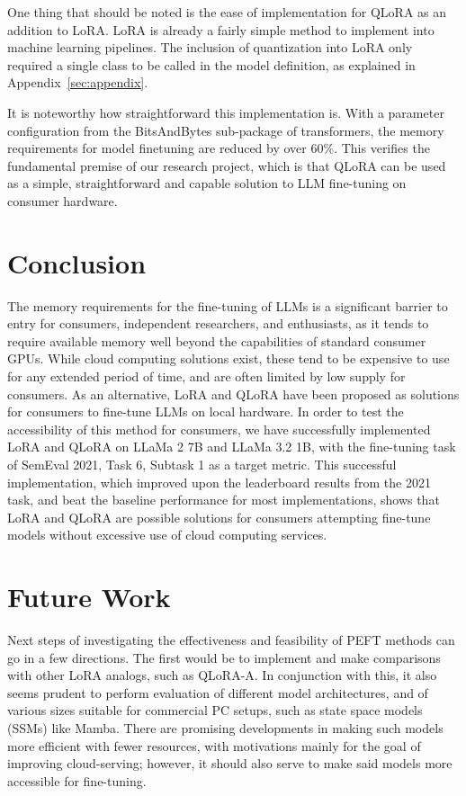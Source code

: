 \documentclass[11pt]{article}
\begin{document}
One thing that should be noted is the ease of implementation for QLoRA as an addition to LoRA. LoRA is already a fairly simple method to implement into machine learning pipelines. The inclusion of quantization into LoRA only required a single class to be called in the model definition, as explained in Appendix~\ref{sec:appendix}.

It is noteworthy how straightforward this implementation is. With a parameter configuration from the BitsAndBytes sub-package of transformers, the memory requirements for model finetuning are reduced by over 60\%. This verifies the fundamental premise of our research project, which is that QLoRA can be used as a simple, straightforward and capable solution to LLM fine-tuning on consumer hardware.

\section{Conclusion}

The memory requirements for the fine-tuning of LLMs is a significant barrier to entry for consumers, independent researchers, and enthusiasts, as it tends to require available memory well beyond the capabilities of standard consumer GPUs. While cloud computing solutions exist, these tend to be expensive to use for any extended period of time, and are often limited by low supply for consumers. As an alternative, LoRA and QLoRA have been proposed as solutions for consumers to fine-tune LLMs on local hardware. In order to test the accessibility of this method for consumers, we have successfully implemented LoRA and QLoRA on LLaMa 2 7B and LLaMa 3.2 1B, with the fine-tuning task of SemEval 2021, Task 6, Subtask 1 as a target metric. This successful implementation, which improved upon the leaderboard results from the 2021 task, and beat the baseline performance for most implementations, shows that LoRA and QLoRA are possible solutions for consumers attempting fine-tune models without excessive use of cloud computing services.

\section{Future Work}
Next steps of investigating the effectiveness and feasibility of PEFT methods can go in a few directions. The first would be to implement and make comparisons with other LoRA analogs, such as QLoRA-A. In conjunction with this, it also seems prudent to perform evaluation of different model architectures, and of various sizes suitable for commercial PC setups, such as state space models (SSMs) like Mamba. There are promising developments in making such models more efficient with fewer resources, with motivations mainly for the goal of improving cloud-serving\cite{quamba}; however, it should also serve to make said models more accessible for fine-tuning.
\end{document}
